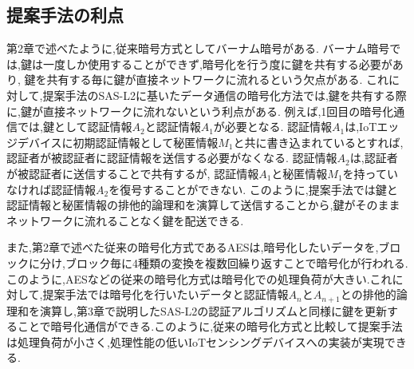 \subsection{提案手法の利点}
 第2章で述べたように,従来暗号方式としてバーナム暗号がある.
 バーナム暗号では,鍵は一度しか使用することができず,暗号化を行う度に鍵を共有する必要があり,
 鍵を共有する毎に鍵が直接ネットワークに流れるという欠点がある.
 これに対して,提案手法のSAS-L2に基いたデータ通信の暗号化方法では,鍵を共有する際に,鍵が直接ネットワークに流れないという利点がある.
 例えば,1回目の暗号化通信では,鍵として認証情報$A_2$と認証情報$A_1$が必要となる.
 認証情報$A_1$は,IoTエッジデバイスに初期認証情報として秘匿情報$M_1$と共に書き込まれているとすれば,
 認証者が被認証者に認証情報を送信する必要がなくなる.
 認証情報$A_2$は,認証者が被認証者に送信することで共有するが,
 認証情報$A_1$と秘匿情報$M_1$を持っていなければ認証情報$A_2$を復号することができない.
 このように,提案手法では鍵と認証情報と秘匿情報の排他的論理和を演算して送信することから,鍵がそのままネットワークに流れることなく鍵を配送できる.


また,第2章で述べた従来の暗号化方式であるAESは,暗号化したいデータを,ブロックに分け,ブロック毎に4種類の変換を複数回繰り返すことで暗号化が行われる.このように,AESなどの従来の暗号化方式は暗号化での処理負荷が大きい.これに対して,提案手法では暗号化を行いたいデータと認証情報$A_n$と$A_{n+1}$との排他的論理和を演算し,第3章で説明したSAS-L2の認証アルゴリズムと同様に鍵を更新することで暗号化通信ができる.このように,従来の暗号化方式と比較して提案手法は処理負荷が小さく,処理性能の低いIoTセンシングデバイスへの実装が実現できる.
